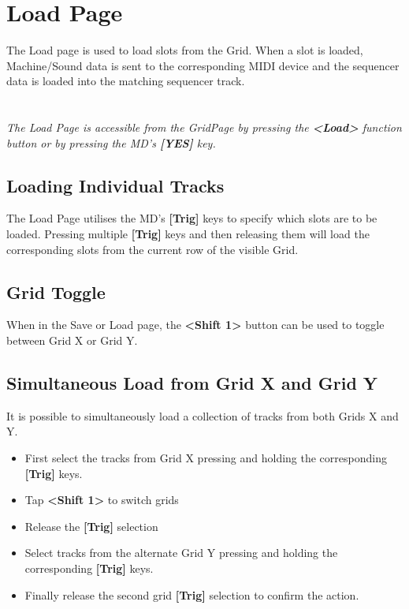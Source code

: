 \chapter{Load Page}
The Load page is used to load slots from the Grid. When a slot is loaded, Machine/Sound data is sent to the corresponding MIDI device and the sequencer data is loaded into the matching sequencer track.\\
\\
\\
\textit{The Load Page is accessible from the GridPage by pressing the  \textbf{<Load>} function button or by pressing the MD's \textbf{[YES]} key.}

\newpage
\section{Loading Individual Tracks}
The Load Page utilises the MD's \textbf{[Trig]} keys to specify which slots are to be loaded. Pressing multiple \textbf{[Trig]} keys and then releasing them will load the corresponding slots from the current row of the visible Grid.
\section{Grid Toggle}
When in the Save or Load page, the \textbf{<Shift 1>} button can be used to toggle between Grid X or Grid Y.
\section{Simultaneous Load from Grid X and Grid Y}
It is possible to simultaneously load a collection of tracks from both Grids X and Y. 
\begin{itemize}
\item First select the tracks from Grid X pressing and holding the corresponding \textbf{[Trig]} keys.
\item Tap \textbf{<Shift 1>} to switch grids
\item Release the \textbf{[Trig]} selection
\item Select tracks from the alternate Grid Y pressing and holding the corresponding \textbf{[Trig]} keys. 
\item Finally release the second grid \textbf{[Trig]} selection to confirm the action. 
\end{itemize}

